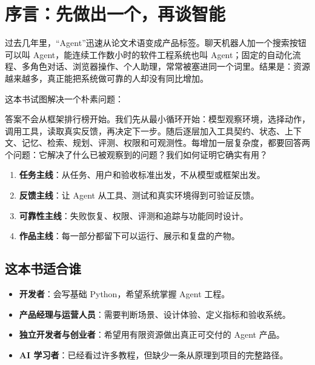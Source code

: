 \chapter*{序言：先做出一个，再谈智能}

过去几年里，“Agent”迅速从论文术语变成产品标签。聊天机器人加一个搜索按钮可以叫 Agent，能连续工作数小时的软件工程系统也叫 Agent；固定的自动化流程、多角色对话、浏览器操作、个人助理，常常被塞进同一个词里。结果是：资源越来越多，真正能把系统做可靠的人却没有同比增加。

这本书试图解决一个朴素问题：

答案不会从框架排行榜开始。我们先从最小循环开始：模型观察环境，选择动作，调用工具，读取真实反馈，再决定下一步。随后逐层加入工具契约、状态、上下文、记忆、检索、规划、评测、权限和可观测性。每增加一层复杂度，都要回答两个问题：它解决了什么已被观察到的问题？我们如何证明它确实有用？

\begin{takeaway}[这本书的四条主线]
\begin{enumerate}
  \item \textbf{任务主线}：从任务、用户和验收标准出发，不从模型或框架出发。
  \item \textbf{反馈主线}：让 Agent 从工具、测试和真实环境得到可验证反馈。
  \item \textbf{可靠性主线}：失败恢复、权限、评测和追踪与功能同时设计。
  \item \textbf{作品主线}：每一部分都留下可以运行、展示和复盘的产物。
\end{enumerate}
\end{takeaway}

\section*{这本书适合谁}

\begin{itemize}
  \item \textbf{开发者}：会写基础 Python，希望系统掌握 Agent 工程。
  \item \textbf{产品经理与运营人员}：需要判断场景、设计体验、定义指标和验收系统。
  \item \textbf{独立开发者与创业者}：希望用有限资源做出真正可交付的 Agent 产品。
  \item \textbf{AI 学习者}：已经看过许多教程，但缺少一条从原理到项目的完整路径。
\end{itemize}

